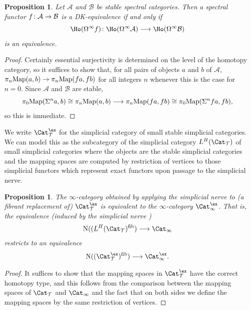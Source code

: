 \documentclass{amsart}
\renewcommand{\to}{\mathchoice{\longrightarrow}{\rightarrow}{\rightarrow}{\rightarrow}}
\let\catsymbfont\mathcal
\newcommand{\aA}{{\catsymbfont{A}}}
\newcommand{\aB}{{\catsymbfont{B}}}
\newcommand{\T}{\mathcal{T}}
\newcommand{\N}{\mathrm{N}}
\newcommand{\icat}{\Cat_\i}
\newcommand{\stabcat}{\Cat_\i^{\ex}}
\newcommand{\Map}{\mathrm{Map}}%
\renewcommand{\i}{\infty}
\numberwithin{equation}{section}
\newtheorem{proposition}[equation]{Proposition}
\theoremstyle{definition}
\begin{document}
\begin{proposition}\label{prop:stabspecDK}
Let $\aA$ and $\aB$ be stable spectral categories.
Then a spectral functor $f\colon \aA\to\aB$ is a DK-equivalence if and only
if 
\[
\Ho(\Omega^\i f) \colon \Ho(\Omega^\i\aA)\to\Ho(\Omega^\i\aB)
\] 
is an equivalence.
\end{proposition}

\begin{proof}
Certainly essential surjectivity is determined on the level of the
homotopy category, so it suffices to show that, for all pairs of
objects $a$ and $b$ of $\aA$, $\pi_n\Map(a,b)\to\pi_n\Map(fa,fb)$ for
all integers $n$ whenever this is the case for $n=0$. 
Since $\aA$ and $\aB$ are stable,
\[
\pi_0\Map(\Sigma^n
a,b)\cong\pi_n\Map(a,b)\to\pi_n\Map(fa,fb)\cong\pi_0\Map(\Sigma^n fa,fb), 
\]
so this is immediate.
\end{proof}

We write $\Cat_\T^{\ex}$ for the simplicial category of small
stable simplicial categories.  We can model this as the subcategory of
the simplicial category $L^H(\Cat_\T)$ of small simplicial categories
where the objects are the stable simplicial categories and the mapping
spaces are computed by restriction of vertices to those simplicial functors which represent exact functors upon passage to the simplicial nerve.

\begin{proposition}
The $\i$-category obtained by applying the simplicial nerve to (a
fibrant replacement of) $\Cat_\T^{\ex}$ is equivalent to the
$\i$-category $\stabcat$.  That is, the equivalence (induced by the
simplicial nerve \cite[2.2.0.1]{HTT}) 
\[
\N((L^H(\Cat_\T)^{\mathrm{fib}}) \to\Cat_\i
\]
restricts to an equivalence
\[
\N((\Cat_\T^{\ex})^{\mathrm{fib}}) \to\Cat_\i^{\ex}.
\]

\end{proposition}

\begin{proof}
It suffices to show that the mapping spaces in $\Cat_\T^{\ex}$
have the correct homotopy type, and this follows from the comparison
between the mapping spaces of $\Cat_\T$ and
$\icat$ \cite[2.2.0.1]{HTT} and the fact that on both sides we define
the mapping spaces by the same restriction of vertices.
\end{proof}
\end{document}
